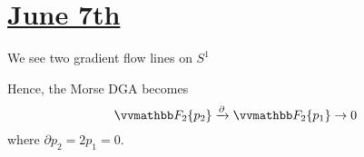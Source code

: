 \documentclass[11pt,letterpaper]{article}
\begin{document}
\section*{\underline{June 7th}}

We see two gradient flow lines on $S^1$ \TODO

Hence, the Morse DGA becomes
\[\F_2\{p_2\}\xrightarrow{\partial} \F_2\{p_1\}\rightarrow 0\]
where $\partial p_2 = 2p_1=0$.





\end{document}
